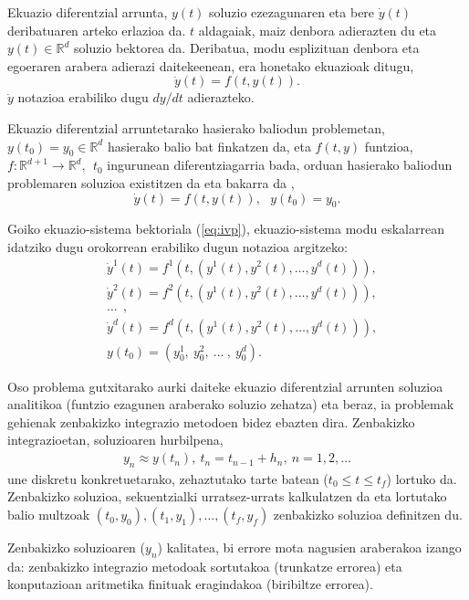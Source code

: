 Ekuazio diferentzial arrunta, $y(t)$ soluzio ezezagunaren eta bere $\dot{y}(t)$ deribatuaren arteko erlazioa da. $t$ aldagaiak, maiz denbora adierazten du eta $y(t) \in \mathbb{R}^{d}$ soluzio bektorea da. Deribatua, modu esplizituan denbora eta egoeraren arabera  adierazi daitekeenean, era honetako ekuazioak ditugu,
\begin{equation}
 \label{eq:201}
\dot{y}(t)=f(t,y(t)). 
\end{equation} 
$\dot{y}$ notazioa erabiliko dugu $dy/dt$ adierazteko.

Ekuazio diferentzial arruntetarako hasierako baliodun problemetan,  $y(t_0)=y_0 \in \mathbb{R}^d$ hasierako balio bat finkatzen da, eta $f(t,y)$ funtzioa, $f: \mathbb{R}^{d+1} \longrightarrow \mathbb{R}^d, \ \ t_0$ ingurunean diferentziagarria bada, orduan hasierako baliodun problemaren soluzioa existitzen da eta bakarra da \cite{Hairer2006},
\begin{equation}
 \label{eq:ivp}
\dot{y}(t)=f(t,y(t)), \ \ \ y(t_0)=y_0.
\end{equation} 

Goiko ekuazio-sistema bektoriala (\ref{eq:ivp}), ekuazio-sistema modu eskalarrean idatziko dugu orokorrean erabiliko dugun notazioa argitzeko:
\begin{align*}
&\dot{y}^1(t)=f^1(t,(y^1(t),y^2(t),\ldots,y^d(t))), \\
&\dot{y}^2(t)=f^2(t,(y^1(t),y^2(t),\ldots,y^d(t))), \\
&\ldots\ \ ,\\
&\dot{y}^d(t)=f^d(t,(y^1(t),y^2(t),\ldots,y^d(t))),  \\
& y(t_0)=(y_{0}^1,\ y_{0}^2,\ \ldots \ , \ y_{0}^d).
\end{align*}


Oso problema gutxitarako aurki daiteke ekuazio diferentzial arrunten soluzioa analitikoa (funtzio ezagunen araberako soluzio zehatza) eta beraz, ia problemak gehienak zenbakizko integrazio metodoen bidez ebazten dira.
Zenbakizko integrazioetan, soluzioaren hurbilpena,
\begin{align*}
 y_n \approx y(t_n), \ t_n=t_{n-1}+h_n, \ n=1,2,\dots
\end{align*}
une diskretu konkretuetarako, zehaztutako tarte batean ($t_0\le t \le t_f$) lortuko da. Zenbakizko soluzioa, sekuentzialki urratsez-urrats kalkulatzen da eta lortutako balio  multzoak $(t_0,y_0),(t_1,y_1),\dots,(t_f,y_f)$ zenbakizko soluzioa definitzen du.   

Zenbakizko soluzioaren ($y_n$) kalitatea, bi errore mota nagusien araberakoa izango da: zenbakizko integrazio metodoak sortutakoa (trunkatze errorea) eta konputazioan aritmetika finituak eragindakoa (biribiltze errorea). 

